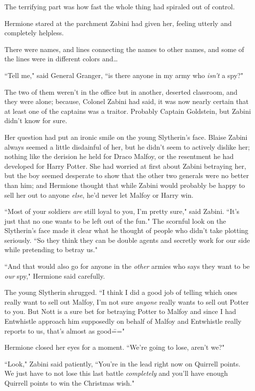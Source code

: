 The terrifying part was how fast the whole thing had spiraled out of control.

Hermione stared at the parchment Zabini had given her, feeling utterly and completely helpless.

There were names, and lines connecting the names to other names, and some of the lines were in different colors and{\ldots}

``Tell me," said General Granger, ``is there anyone in my army who \emph{isn't} a spy?"

The two of them weren't in the office but in another, deserted classroom, and they were alone; because, Colonel Zabini had said, it was now nearly certain that at least one of the captains was a traitor. Probably Captain Goldstein, but Zabini didn't know for sure.

Her question had put an ironic smile on the young Slytherin's face. Blaise Zabini always seemed a little disdainful of her, but he didn't seem to actively dislike her; nothing like the derision he held for Draco Malfoy, or the resentment he had developed for Harry Potter. She had worried at first about Zabini betraying her, but the boy seemed desperate to show that the other two generals were no better than him; and Hermione thought that while Zabini would probably be happy to sell her out to anyone \emph{else}, he'd never let Malfoy or Harry win.

``Most of your soldiers \emph{are} still loyal to you, I'm pretty sure," said Zabini. ``It's just that no one wants to be left out of the fun." The scornful look on the Slytherin's face made it clear what he thought of people who didn't take plotting seriously. ``So they think they can be double agents and secretly work for our side while pretending to betray us."

``And that would also go for anyone in the \emph{other} armies who says they want to be \emph{our} spy," Hermione said carefully.

The young Slytherin shrugged. ``I think I did a good job of telling which ones really want to sell out Malfoy, I'm not sure \emph{anyone} really wants to sell out Potter to you. But Nott is a sure bet for betraying Potter to Malfoy and since I had Entwhistle approach him supposedly on behalf of Malfoy and Entwhistle really reports to us, that's almost as good\==="

Hermione closed her eyes for a moment. ``We're going to lose, aren't we?"

``Look," Zabini said patiently, ``You're in the lead right now on Quirrell points. We just have to not lose this last battle \emph{completely} and you'll have enough Quirrell points to win the Christmas wish."


